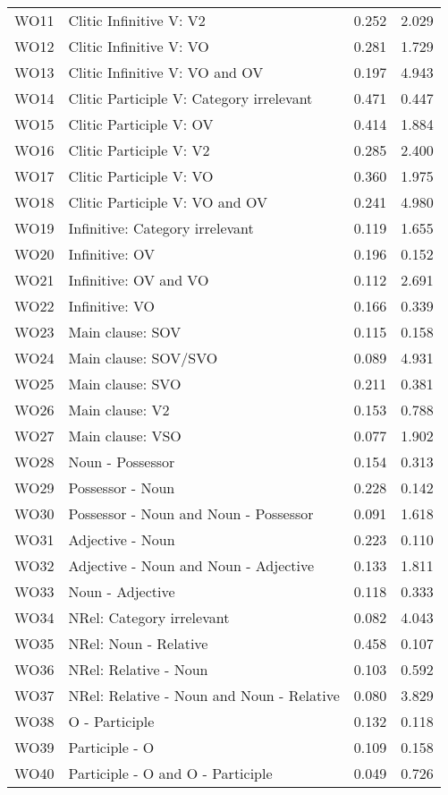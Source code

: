 \begin{longtable}{llll}
WO11 & Clitic Infinitive V: V2 & 0.252 & 2.029\\
WO12 & Clitic Infinitive V: VO & 0.281 & 1.729\\
WO13 & Clitic Infinitive V: VO and OV & 0.197 & 4.943\\
WO14 & Clitic Participle V: Category irrelevant & 0.471 & 0.447\\
WO15 & Clitic Participle V: OV & 0.414 & 1.884\\
WO16 & Clitic Participle V: V2 & 0.285 & 2.400\\
WO17 & Clitic Participle V: VO & 0.360 & 1.975\\
WO18 & Clitic Participle V: VO and OV & 0.241 & 4.980\\
WO19 & Infinitive: Category irrelevant & 0.119 & 1.655\\
WO20 & Infinitive: OV & 0.196 & 0.152\\
WO21 & Infinitive: OV and VO & 0.112 & 2.691\\
WO22 & Infinitive: VO & 0.166 & 0.339\\
WO23 & Main clause: SOV & 0.115 & 0.158\\
WO24 & Main clause: SOV/SVO & 0.089 & 4.931\\
WO25 & Main clause: SVO & 0.211 & 0.381\\
WO26 & Main clause: V2 & 0.153 & 0.788\\
WO27 & Main clause: VSO & 0.077 & 1.902\\
WO28 & Noun - Possessor & 0.154 & 0.313\\
WO29 & Possessor - Noun & 0.228 & 0.142\\
WO30 & Possessor - Noun and Noun - Possessor & 0.091 & 1.618\\
WO31 & Adjective - Noun & 0.223 & 0.110\\
WO32 & Adjective - Noun and Noun - Adjective & 0.133 & 1.811\\
WO33 & Noun - Adjective & 0.118 & 0.333\\
WO34 & NRel: Category irrelevant & 0.082 & 4.043\\
WO35 & NRel: Noun - Relative & 0.458 & 0.107\\
WO36 & NRel: Relative - Noun & 0.103 & 0.592\\
WO37 & NRel: Relative - Noun and Noun - Relative & 0.080 & 3.829\\
WO38 & O - Participle & 0.132 & 0.118\\
WO39 & Participle - O & 0.109 & 0.158\\
WO40 & Participle - O and O - Participle & 0.049 & 0.726\\

\end{longtable}
